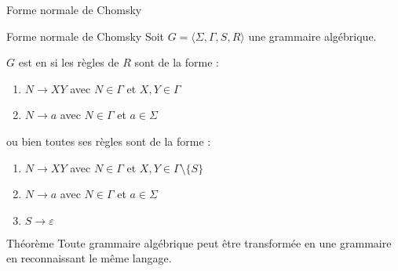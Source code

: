 \begin{frame}{Forme normale de Chomsky}
  
  \begin{block}{Forme normale de Chomsky}
    Soit $G = \langle \Sigma, \Gamma, S, R \rangle$ une grammaire algébrique.

    $G$ est en  si les règles de $R$ sont de la forme :
    \begin{enumerate}
    \item $N \rightarrow XY$ \hspace{5mm} avec $N\in \Gamma$ et $X, Y \in \Gamma$
    \item $N \rightarrow a$  \hspace{8mm} avec $N \in \Gamma$ et $a\in \Sigma$
    \end{enumerate}
    ou bien toutes ses règles sont de la forme :
    \begin{enumerate}
    \item $N \rightarrow XY$ \hspace{5mm} avec $N\in \Gamma$ et $X, Y \in \Gamma \setminus \{S\}$
    \item $N \rightarrow a$  \hspace{8mm} avec $N \in \Gamma$ et $a\in \Sigma$
    \item $S \rightarrow \varepsilon$
    \end{enumerate}
  \end{block}

  \begin{block}{Théorème}
    Toute grammaire algébrique peut être transformée en une
    grammaire en  reconnaissant le même langage. 
  \end{block}
\end{frame}

